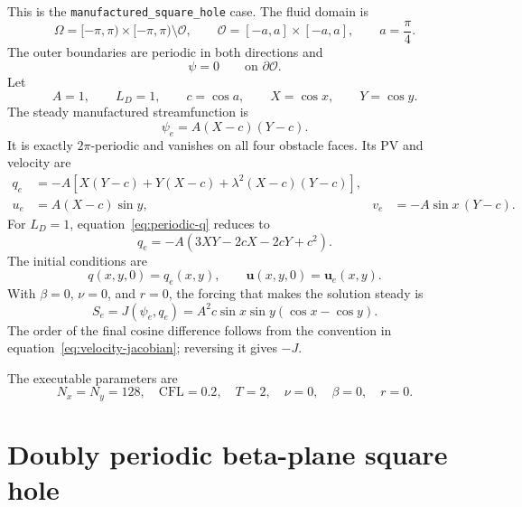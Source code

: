 \documentclass[11pt]{article}
\newcommand{\Oh}{\mathcal{O}}
\newcommand{\Om}{\Omega}
\begin{document}
This is the \texttt{manufactured\_square\_hole} case.  The fluid domain is
\begin{equation}
  \Om = [-\pi,\pi)\times[-\pi,\pi)\setminus\Oh,
  \qquad
  \Oh=[-a,a]\times[-a,a],
  \qquad a=\frac{\pi}{4}.
\end{equation}
The outer boundaries are periodic in both directions and
\begin{equation}
  \psi=0\qquad\text{on }\partial\Oh.
\end{equation}
Let
\begin{equation}
  A=1,
  \qquad L_D=1,
  \qquad c=\cos a,
  \qquad X=\cos x,
  \qquad Y=\cos y.
\end{equation}
The steady manufactured streamfunction is
\begin{equation}
  \psi_e=A(X-c)(Y-c).
  \label{eq:periodic-psi}
\end{equation}
It is exactly $2\pi$-periodic and vanishes on all four obstacle faces.  Its
PV and velocity are
\begin{align}
  q_e &=-A\left[
      X(Y-c)+Y(X-c)+\lambda^2(X-c)(Y-c)
    \right],
    \label{eq:periodic-q}\\
  u_e &= A(X-c)\sin y,
  &
  v_e &=-A\sin x\,(Y-c).
  \label{eq:periodic-velocity}
\end{align}
For $L_D=1$, equation~\eqref{eq:periodic-q} reduces to
\begin{equation}
  q_e=-A\left(3XY-2cX-2cY+c^2\right).
\end{equation}
The initial conditions are
\begin{equation}
  q(x,y,0)=q_e(x,y),
  \qquad
  \boldsymbol{u}(x,y,0)=\boldsymbol{u}_e(x,y).
\end{equation}
With $\beta=0$, $\nu=0$, and $r=0$, the forcing that makes the solution
steady is
\begin{equation}
  S_e=J(\psi_e,q_e)
  =A^2c\sin x\sin y\left(\cos x-\cos y\right).
  \label{eq:periodic-source}
\end{equation}
The order of the final cosine difference follows from the convention in
equation~\eqref{eq:velocity-jacobian}; reversing it gives $-J$.

The executable parameters are
\begin{equation}
  N_x=N_y=128,\quad
  \mathrm{CFL}=0.2,\quad
  T=2,\quad
  \nu=0,\quad
  \beta=0,\quad
  r=0.
\end{equation}

\section{Doubly periodic beta-plane square hole}
\label{sec:beta-hole}
\end{document}

